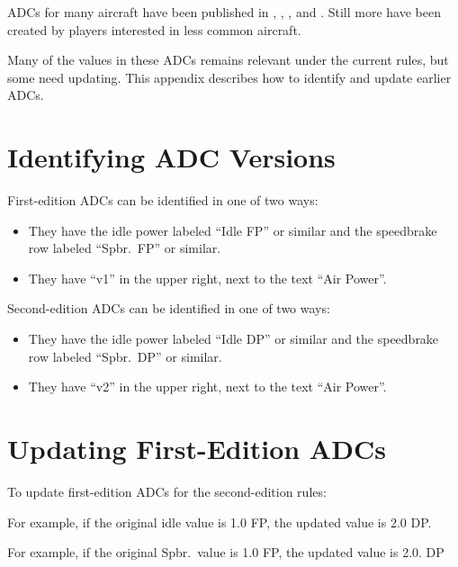 

ADCs for many aircraft have been published in {\AirSup}, {\AirStr}, {\TSOH}, and {\APJ}. Still more have been created by players interested in less common aircraft. 

Many of the values in these ADCs remains relevant under the current rules, but some need updating. This appendix describes how to identify and update earlier ADCs.


\section{Identifying ADC Versions}

First-edition ADCs can be identified in one of two ways:
\begin{itemize} 
\item They have the idle power labeled “Idle FP” or similar and the speedbrake row labeled “Spbr.\ FP” or similar. 
\item They have “v1” in the upper right, next to the text “Air Power”.
\end{itemize}

Second-edition ADCs can be identified in one of two ways:
\begin{itemize} 
\item They have the idle power labeled “Idle DP” or similar and the speedbrake row labeled “Spbr.\ DP” or similar. 
\item They have “v2” in the upper right, next to the text “Air Power”.
\end{itemize}


\section{Updating First-Edition ADCs}

To update first-edition ADCs for the second-edition rules:

\begin{itemize}


For example, if the original idle value is 1.0 FP, the updated value is 2.0 DP.


For example, if the original Spbr.\ value is 1.0 FP, the updated value is 2.0. DP


\end{itemize}

